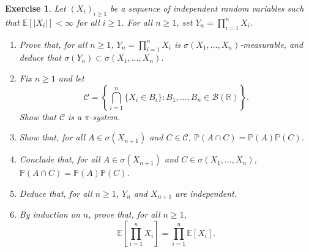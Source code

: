 \documentclass{article}
\newtheorem{exercise}[theorem]{Exercise}
\begin{document}
\begin{exercise}
Let $(X_i)_{i \geq 1}$ be a sequence of independent random variables such that $\mathbb{E}[|X_i|] < \infty$ for all $i \geq 1$. For all $n \geq 1$, set $Y_n = \prod_{i=1}^n X_i$.

\begin{enumerate}
    \item[(a)] Prove that, for all $n \geq 1$, $Y_n = \prod_{i=1}^n X_i$ is $\sigma(X_1, \ldots, X_n)$-measurable, and deduce that $\sigma(Y_n) \subset \sigma(X_1, \ldots, X_n)$.
    
    \item[(b)] Fix $n \geq 1$ and let
    \[
    \mathcal{C} = \left\{ \bigcap_{i=1}^n \{X_i \in B_i\} : B_1, \ldots, B_n \in \mathcal{B}(\mathbb{R}) \right\}.
    \]
    Show that $\mathcal{C}$ is a $\pi$-system.
    
    \item[(c)] Show that, for all $A \in \sigma(X_{n+1})$ and $C \in \mathcal{C}$, $\mathbb{P}(A \cap C) = \mathbb{P}(A)\mathbb{P}(C)$.
    
    \item[(d)] Conclude that, for all $A \in \sigma(X_{n+1})$ and $C \in \sigma(X_1, \ldots, X_n)$, $\mathbb{P}(A \cap C) = \mathbb{P}(A)\mathbb{P}(C)$.
    
    \item[(e)] Deduce that, for all $n \geq 1$, $Y_n$ and $X_{n+1}$ are independent.
    
    \item[(f)] By induction on $n$, prove that, for all $n \geq 1$,
    \[
    \mathbb{E} \left[ \prod_{i=1}^n X_i \right] = \prod_{i=1}^n \mathbb{E}[X_i]. \tag{2}
    \]
\end{enumerate}
\end{exercise}
\end{document}
